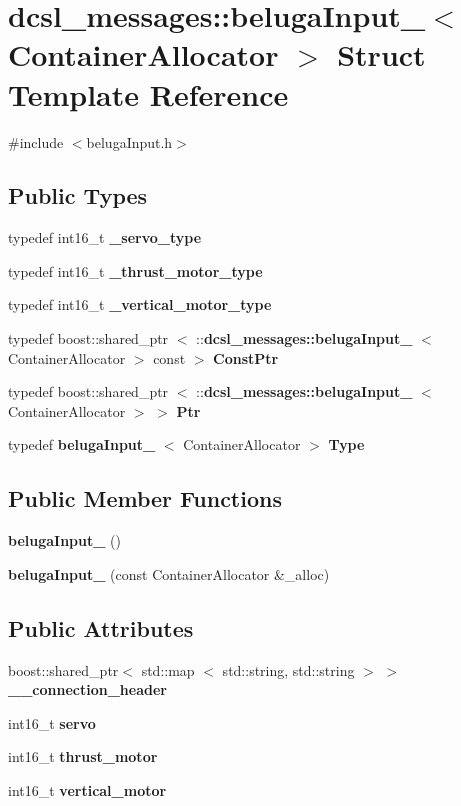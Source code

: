 \section{dcsl\-\_\-messages\-:\-:beluga\-Input\-\_\-$<$ \-Container\-Allocator $>$ \-Struct \-Template \-Reference}
\label{structdcsl__messages_1_1belugaInput__}


{\ttfamily \#include $<$beluga\-Input.\-h$>$}

\subsection*{\-Public \-Types}
\begin{DoxyCompactItemize}
\item 
typedef int16\-\_\-t {\bf \-\_\-servo\-\_\-type}
\item 
typedef int16\-\_\-t {\bf \-\_\-thrust\-\_\-motor\-\_\-type}
\item 
typedef int16\-\_\-t {\bf \-\_\-vertical\-\_\-motor\-\_\-type}
\item 
typedef boost\-::shared\-\_\-ptr\*
$<$ \-::{\bf dcsl\-\_\-messages\-::beluga\-Input\-\_\-}\*
$<$ \-Container\-Allocator $>$ const  $>$ {\bf \-Const\-Ptr}
\item 
typedef boost\-::shared\-\_\-ptr\*
$<$ \-::{\bf dcsl\-\_\-messages\-::beluga\-Input\-\_\-}\*
$<$ \-Container\-Allocator $>$ $>$ {\bf \-Ptr}
\item 
typedef {\bf beluga\-Input\-\_\-}\*
$<$ \-Container\-Allocator $>$ {\bf \-Type}
\end{DoxyCompactItemize}
\subsection*{\-Public \-Member \-Functions}
\begin{DoxyCompactItemize}
\item 
{\bf beluga\-Input\-\_\-} ()
\item 
{\bf beluga\-Input\-\_\-} (const \-Container\-Allocator \&\-\_\-alloc)
\end{DoxyCompactItemize}
\subsection*{\-Public \-Attributes}
\begin{DoxyCompactItemize}
\item 
boost\-::shared\-\_\-ptr$<$ std\-::map\*
$<$ std\-::string, std\-::string $>$ $>$ {\bf \-\_\-\-\_\-connection\-\_\-header}
\item 
int16\-\_\-t {\bf servo}
\item 
int16\-\_\-t {\bf thrust\-\_\-motor}
\item 
int16\-\_\-t {\bf vertical\-\_\-motor}
\end{DoxyCompactItemize}


